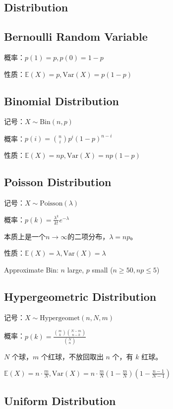 \documentclass[9pt,landscape]{article}
\begin{document}
\begin{multicols}{3}
\section{Distribution}

\subsection{Bernoulli Random Variable}

概率：$p(1)=p, p(0)=1-p$

性质：$\mathbb{E}(X)=p,\text{Var}(X)=p(1-p)$

\subsection{Binomial Distribution}
记号：$X\sim \mathrm{Bin}(n,p)$

概率：$p(i)=\binom{n}{i}p^i(1-p)^{n-i}$

性质：$\mathbb{E}(X)=np,\text{Var}(X)=np(1-p)$

\subsection{Poisson Distribution}

记号：$X \sim \text{Poisson}(\lambda)$

概率：$p(k)=\frac{\lambda^k}{k!}e^{-\lambda}$

本质上是一个$n\to\infty$的二项分布，$\lambda=np$。

性质：$\mathbb{E}(X)=\lambda,\text{Var}(X)=\lambda$

Approximate Bin: $n$ large, $p$ small ($n \ge 50, np \le 5$)

\subsection{Hypergeometric Distribution}

记号：$X \sim \text{Hypergeomet}(n, N, m)$

概率：$p(k)=\frac{\binom{m}{k}\binom{N-m}{n-k}}{\binom{N}{n}}$

$N$ 个球，$m$ 个红球，不放回取出 $n$ 个，有 $k$ 红球。

$\mathbb{E}(X)=n\cdot\frac{m}{N}, \mathrm{Var}(X)=n\cdot \frac{m}{N}\left(1-\frac{m}{N}\right)\left(1-\frac{n-1}{N-1}\right)$

\subsection{Uniform Distribution}


\end{multicols}
\end{document}
